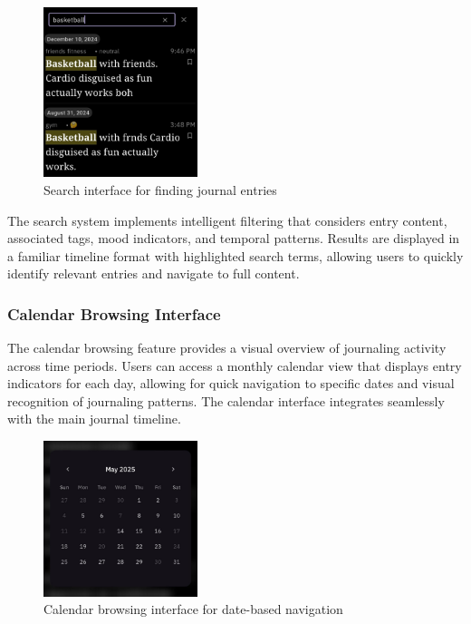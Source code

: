 \nopagebreak
\begin{figure}[H]
\centering
\includegraphics[width=0.4\textwidth]{files/imgs/prototype/search_interface.jpeg}
\caption{Search interface for finding journal entries}
\label{fig:search-interface}
\end{figure}

The search system implements intelligent filtering that considers entry content, associated tags, mood indicators, and temporal patterns. Results are displayed in a familiar timeline format with highlighted search terms, allowing users to quickly identify relevant entries and navigate to full content.

\subsubsection{Calendar Browsing Interface}

The calendar browsing feature provides a visual overview of journaling activity across time periods. Users can access a monthly calendar view that displays entry indicators for each day, allowing for quick navigation to specific dates and visual recognition of journaling patterns. The calendar interface integrates seamlessly with the main journal timeline.

\nopagebreak
\begin{figure}[H]
\centering
\includegraphics[width=0.4\textwidth]{files/imgs/prototype/calendar_browsing.jpeg}
\caption{Calendar browsing interface for date-based navigation}
\label{fig:calendar-browsing}
\end{figure}

